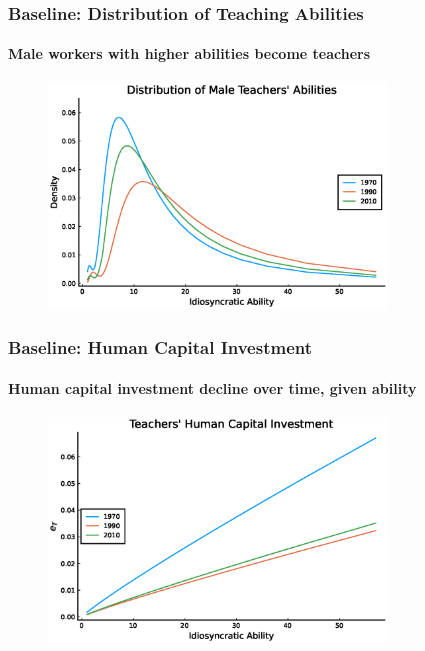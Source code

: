 \documentclass[11pt]{beamer}
\begin{document}
\begin{frame}
\frametitle{Baseline: Distribution of Teaching Abilities}
\framesubtitle{Male workers with higher abilities become teachers}
\label{base_maleabil}
\begin{figure}
 		\begin{center}
\includegraphics[width=0.8\textwidth]{fT_men_steadystate.eps}
 			\label{ }
 		\end{center}
 	\end{figure}
    \hyperlink{counter_maleabil}{} %
\end{frame}

\begin{frame}
\frametitle{Baseline: Human Capital Investment}
\framesubtitle{Human capital investment decline over time, given ability}
\label{base_invest}
\begin{figure}
 		\begin{center}
 			\includegraphics[width=0.8\textwidth]{eT_steadystate.eps}
 			\label{ }
 		\end{center}
 	\end{figure}
  \hyperlink{counter_invest}{} %
\end{frame}
\end{document}
